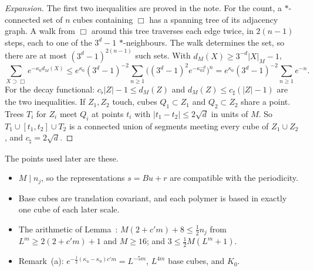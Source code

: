 \begin{proof}[Expansion]
The first two inequalities are proved in the note. For the count, a $*$-connected set of $n$ cubes containing $\Box$ has a spanning tree of its adjacency graph. A walk from $\Box$ around this tree traverses each edge twice, in $2(n-1)$ steps, each to one of the $3^d-1$ $*$-neighbours. The walk determines the set, so there are at most $(3^d-1)^{2(n-1)}$ such sets. With $d_M(X)\ge3^{-d}|X|_M-1$,
\[
\sum_{X\supset\Box}e^{-\kappa_0d_M(X)}\le e^{\kappa_0}(3^d-1)^{-2}\sum_{n\ge1}\big((3^d-1)^2e^{-\kappa_03^{-d}}\big)^n=e^{\kappa_0}(3^d-1)^{-2}\sum_{n\ge1}e^{-n}.
\]
For the decay functional: $c_\flat|Z|-1\le d_M(Z)$ and $d_M(Z)\le c_\sharp(|Z|-1)$ are the two inequalities. If $Z_1,Z_2$ touch, cubes $Q_1\subset Z_1$ and $Q_2\subset Z_2$ share a point. Trees $T_i$ for $Z_i$ meet $Q_i$ at points $t_i$ with $|t_1-t_2|\le2\sqrt d$ in units of $M$. So $T_1\cup[t_1,t_2]\cup T_2$ is a connected union of segments meeting every cube of $Z_1\cup Z_2$, and $c_\natural=2\sqrt d$.
\end{proof}

\begin{detail}\label{xb:d-grids}
The points used later are these.
\begin{itemize}
\item $M\mid n_j$, so the representations $s=Bu+r$ are compatible with the periodicity.
\item Base cubes are translation covariant, and each polymer is based in exactly one cube of each later scale.
\item The arithmetic of Lemma~: $M(2+c'm)+8\le\frac12n_j$ from $L^m\ge2(2+c'm)+1$ and $M\ge16$; and $3\le\frac12M(L^m+1)$.
\item Remark~(a): $e^{-\frac12(\kappa_n-\kappa_0)c'm}=L^{-5m}$, $L^{4m}$ base cubes, and $K_0$.
\end{itemize}
\end{detail}

